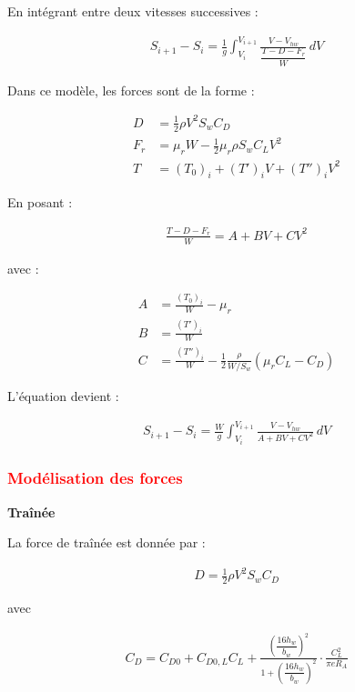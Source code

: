	En intégrant entre deux vitesses successives :
	
	\begin{align}
		S_{i+1}-S_i= \frac{1}{g} \int_{V_i}^{V_{i+1}} \frac{V-V_{hw}} {\dfrac{T-D-F_r}{W}} \, dV
	\end{align}
	
	Dans ce modèle, les forces sont de la forme :
	
	\begin{align}
		D &= \frac{1}{2}\rho V^2 S_w C_D \\
		F_r &= \mu_r W - \frac{1}{2}\mu_r \rho S_w C_L V^2 \\
		T &= (T_0)_i + (T')_i V + (T'')_i V^2
	\end{align}
	
	En posant :
	
	\begin{align}
		\frac{T-D-F_r}{W}=A+BV+CV^2
	\end{align}
	
	avec :
	
	\begin{align}
		A &= \frac{(T_0)_i}{W}-\mu_r \\
		B &= \frac{(T')_i}{W} \\
		C &= \frac{(T'')_i}{W} 	-\frac{1}{2} \frac{\rho}{W/S_w} (\mu_r C_L-C_D)
	\end{align}
	
	L’équation devient :
	
	\begin{align}
		S_{i+1}-S_i	=	\frac{W}{g}	\int_{V_i}^{V_{i+1}} \frac{V-V_{hw}} {A+BV+CV^2} \, dV
	\end{align}
	
	\vspace{1cm}
	
	\subsubsection{\textcolor{red}{Modélisation des forces}}
	
	\textbf{Traînée}
	
	La force de traînée est donnée par :
	
	\begin{align}
		D=\frac{1}{2}\rho V^2 S_w C_D
	\end{align}
	
	avec
	
	\begin{align}
		C_D= C_{D0}	+	C_{D0,L}C_L +
		\frac{	\left(\dfrac{16h_w}{b_w}\right)^2  }{ 1+\left(\dfrac{16h_w}{b_w}\right)^2 }	\cdot \frac{C_L^2}{\pi e R_A}
	\end{align}
	
